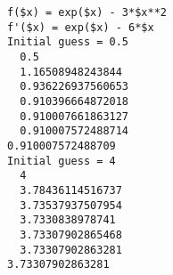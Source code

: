 \begin{verbatim}
f($x) = exp($x) - 3*$x**2
f'($x) = exp($x) - 6*$x
Initial guess = 0.5
  0.5
  1.16508948243844
  0.936226937560653
  0.910396664872018
  0.910007661863127
  0.910007572488714
0.910007572488709
Initial guess = 4
  4
  3.78436114516737
  3.73537937507954
  3.7330838978741
  3.73307902865468
  3.73307902863281
3.73307902863281
\end{verbatim}
